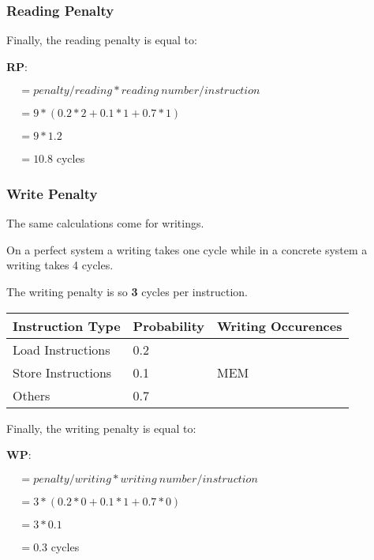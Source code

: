 \begin{frame}
  \frametitle{Reading Penalty}

  Finally, the reading penalty is equal to:

  \-

  \textbf{RP}:

  $~~~~~= penalty / reading * reading~number / instruction$

  $~~~~~= 9 * (0.2 * 2 + 0.1 * 1 + 0.7 * 1)$

  $~~~~~= 9 * 1.2$

  $~~~~~= 10.8$ cycles
\end{frame}


\begin{frame}
  \frametitle{Write Penalty}

  The same calculations come for writings.

  \-

  On a perfect system a writing takes one cycle while in a concrete system
  a writing takes 4 cycles.

  \-

  The writing penalty is so \textbf{3} cycles per instruction.

  \begin{tabular}{|p{3cm}|p{3cm}|p{3cm}|}
    \hline

    \textbf{Instruction Type} & \textbf{Probability} &
    \textbf{Writing Occurences} \\

    \hline

    Load Instructions & 0.2 & \\

    \hline

    Store Instructions & 0.1 & MEM \\

    \hline

    Others & 0.7 & \\

    \hline
  \end{tabular}

  Finally, the writing penalty is equal to:

  \-

  \textbf{WP}:

  $~~~~~= penalty / writing * writing~number / instruction$

  $~~~~~= 3 * (0.2 * 0 + 0.1 * 1 + 0.7 * 0)$

  $~~~~~= 3 * 0.1$

  $~~~~~= 0.3$ cycles
\end{frame}

